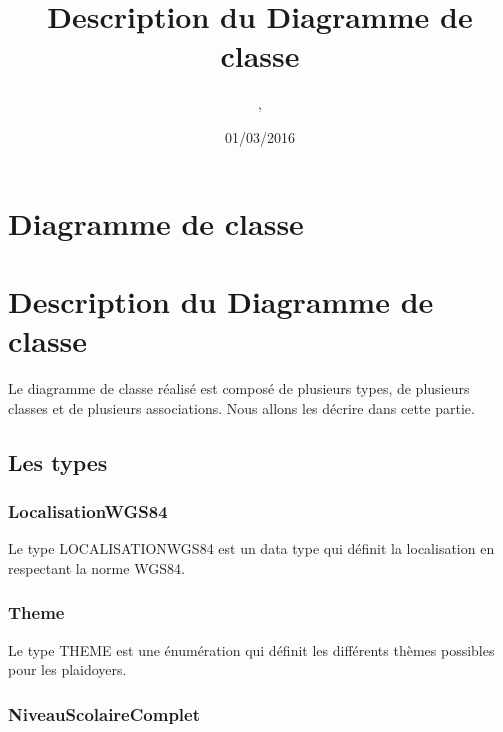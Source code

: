 \documentclass[asi, sansVersion]{picInsa}
\begin{document}
\title{Description du Diagramme de classe}
\author{\Mathieu, \Julie}
\date{01/03/2016} 

\maketitle

\tableofcontents

\chapter{Diagramme de classe}


\chapter{Description du Diagramme de classe}

Le diagramme de classe réalisé est composé de plusieurs types, de plusieurs classes et de plusieurs associations. Nous allons les décrire dans cette partie. \\ 

\section{Les types}

\subsection*{LocalisationWGS84}

Le type LOCALISATIONWGS84 est un data type qui définit la localisation en respectant la norme WGS84.

\subsection*{Theme}

Le type THEME est une énumération qui définit les différents thèmes possibles pour les plaidoyers.

\subsection*{NiveauScolaireComplet}
\end{document}
